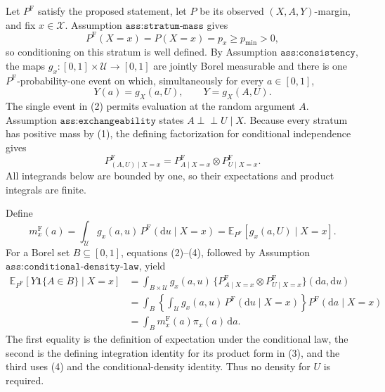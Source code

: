 Let \(P^{\mathrm F}\) satisfy the proposed statement, let \(P\) be its observed \((X,A,Y)\)-margin, and fix \(x\in\mathcal X\). Assumption \(\texttt{ass:stratum-mass}\) gives
\[
 P^{\mathrm F}(X=x)=P(X=x)=p_x\geq p_{\min}>0,
 \tag{1}
\]
so conditioning on this stratum is well defined. By Assumption \(\texttt{ass:consistency}\), the maps \(g_x:[0,1]\times\mathcal U\to[0,1]\) are jointly Borel measurable and there is one \(P^{\mathrm F}\)-probability-one event on which, simultaneously for every \(a\in[0,1]\),
\[
 Y(a)=g_X(a,U),
 \qquad
 Y=g_X(A,U).
 \tag{2}
\]
The single event in (2) permits evaluation at the random argument \(A\). Assumption \(\texttt{ass:exchangeability}\) states \(A\perp\!\!\!\perp U\mid X\). Because every stratum has positive mass by (1), the defining factorization for conditional independence gives
\[
 P^{\mathrm F}_{(A,U)\mid X=x}
 =P^{\mathrm F}_{A\mid X=x}\otimes P^{\mathrm F}_{U\mid X=x}.
 \tag{3}
\]
All integrands below are bounded by one, so their expectations and product integrals are finite.

Define
\[
 m_x^{\mathrm F}(a)
 =\int_{\mathcal U}g_x(a,u)\,
   P^{\mathrm F}(\mathrm du\mid X=x)
 =\mathbb E_{P^{\mathrm F}}[g_x(a,U)\mid X=x].
 \tag{4}
\]
For a Borel set \(B\subseteq[0,1]\), equations (2)--(4), followed by Assumption \(\texttt{ass:conditional-density-law}\), yield
\[
\begin{aligned}
 \mathbb E_{P^{\mathrm F}}[Y\mathbf 1\{A\in B\}\mid X=x]
 &=\int_{B\times\mathcal U}g_x(a,u)\,
   \{P^{\mathrm F}_{A\mid X=x}\otimes P^{\mathrm F}_{U\mid X=x}\}
   (\mathrm da,\mathrm du)\\
 &=\int_B\left\{\int_{\mathcal U}g_x(a,u)\,
   P^{\mathrm F}(\mathrm du\mid X=x)\right\}
   P^{\mathrm F}(\mathrm da\mid X=x)\\
 &=\int_Bm_x^{\mathrm F}(a)\pi_x(a)\,\mathrm da.
\end{aligned}
\tag{5}
\]
The first equality is the definition of expectation under the conditional law, the second is the defining integration identity for its product form in (3), and the third uses (4) and the conditional-density identity. Thus no density for \(U\) is required.


